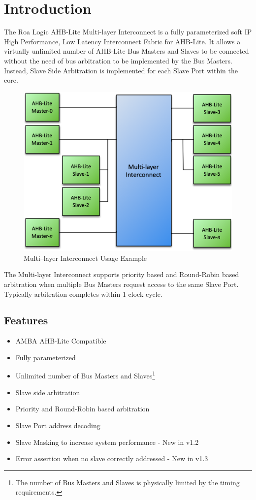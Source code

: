 \chapter{Introduction}\label{introduction}

The Roa Logic AHB-Lite Multi-layer Interconnect is a fully parameterized
soft IP High Performance, Low Latency Interconnect Fabric for AHB-Lite.
It allows a virtually unlimited number of AHB-Lite Bus Masters and
Slaves to be connected without the need of bus arbitration to be
implemented by the Bus Masters. Instead, Slave Side Arbitration is
implemented for each Slave Port within the core.

\begin{figure}[tbh]
  \centering
  \includegraphics[scale=0.9]{assets/img/ahb-lite-switch-sys}
  \caption{Multi--layer Interconnect Usage Example}
  \label{fig:ahb-lite-switch-sys}
\end{figure}


The Multi-layer Interconnect supports priority based and Round-Robin based
arbitration when multiple Bus Masters request access to the same Slave
Port. Typically arbitration completes within 1 clock cycle.

\section{Features}\label{features}

\begin{itemize}
\item
  AMBA AHB-Lite Compatible
\item
  Fully parameterized
\item
  Unlimited number of Bus Masters and Slaves\footnote{The number of Bus
    Masters and Slaves is physically limited by the timing requirements.}
\item
  Slave side arbitration
\item
  Priority and Round-Robin based arbitration
\item
  Slave Port address decoding
\item
  Slave Masking to increase system performance - New in v1.2
\item
  Error assertion when no slave correctly addressed - New in v1.3
\end{itemize}

